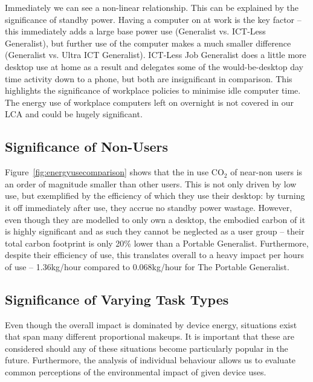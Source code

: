 \documentclass[conference]{IEEEtran}
\begin{document}
Immediately we can see a non-linear relationship. This can be
explained by the significance of standby power. Having a computer on
at work is the key factor -- this immediately adds a large base power
use (Generalist vs. ICT-Less Generalist), but further use of the
computer makes a much smaller difference (Generalist vs. Ultra ICT
Generalist). ICT-Less Job Generalist does a little more desktop use at
home as a result and delegates some of the would-be-desktop day time
activity down to a phone, but both are insignificant in
comparison. This highlights the significance of workplace policies to
minimise idle computer time. The energy use of workplace computers
left on overnight is not covered in our LCA and could be hugely
significant.

\subsection{Significance of Non-Users}

Figure~\ref{fig:energyusecomparison} shows that the in use CO$_2$ of
near-non users is an order of magnitude smaller than other users. This
is not only driven by low use, but exemplified by the efficiency of
which they use their desktop: by turning it off immediately after use,
they accrue no standby power wastage. However, even though they are
modelled to only own a desktop, the embodied carbon of it is highly
significant and as such they cannot be neglected as a user group --
their total carbon footprint is only 20\% lower than a Portable
Generalist. Furthermore, despite their efficiency of use, this
translates overall to a heavy impact per hours of use -- 1.36kg/hour
compared to 0.068kg/hour for The Portable Generalist.

\subsection{Significance of Varying Task Types}

Even though the overall impact is dominated by device energy,
situations exist that span many different proportional makeups. It is
important that these are considered should any of these situations
become particularly popular in the future. Furthermore, the analysis
of individual behaviour allows us to evaluate common perceptions of
the environmental impact of given device uses.
\end{document}
